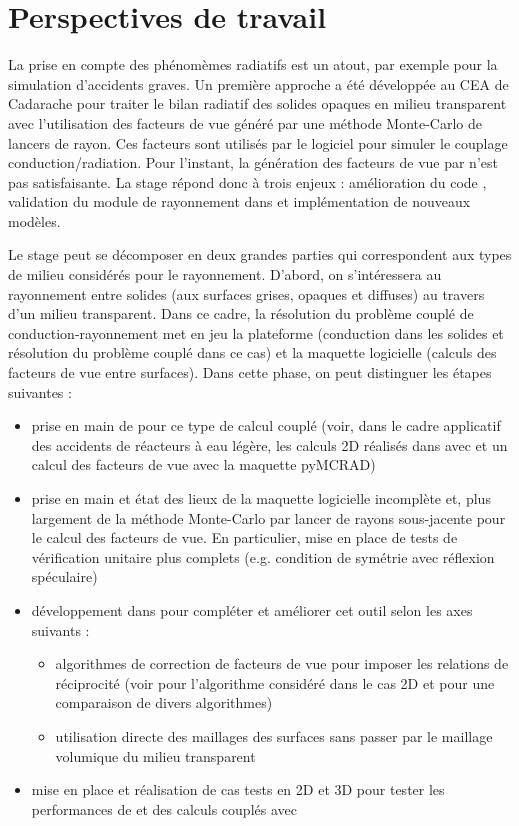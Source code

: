 \newpage
\section{Perspectives de travail}


La prise en compte des phénomèmes radiatifs est un atout, par exemple pour la simulation d'accidents graves. Un première approche a été développée au CEA de Cadarache pour traiter le bilan radiatif des solides opaques en milieu transparent avec l'utilisation des facteurs de vue généré par une méthode Monte-Carlo de lancers de rayon. Ces facteurs sont utilisés par le logiciel  pour simuler le couplage conduction/radiation. Pour l'instant, la génération des facteurs de vue par  n'est pas satisfaisante. La stage répond donc à trois enjeux : amélioration du code , validation du module de rayonnement dans   et implémentation de nouveaux modèles.

Le stage peut se décomposer en deux grandes parties qui correspondent aux types de milieu considérés pour le rayonnement. D’abord, on s’intéressera au rayonnement entre solides (aux surfaces grises, opaques et diffuses) au travers d’un milieu transparent. Dans ce cadre, la résolution du problème couplé de conduction-rayonnement met en jeu la plateforme  (conduction dans les solides et résolution du problème couplé dans ce cas) et la maquette logicielle  (calculs des facteurs de vue entre surfaces). Dans cette phase, on peut distinguer les étapes suivantes :
\begin{itemize}
    \item prise en main de  pour ce type de calcul couplé (voir, dans le cadre applicatif des accidents de réacteurs à eau légère, les calculs 2D réalisés dans \cite{Romain25,Romain26} avec  et un calcul des facteurs de vue avec la maquette pyMCRAD)
    \item prise en main et état des lieux de la maquette logicielle incomplète  et, plus largement de la méthode Monte-Carlo par lancer de rayons sous-jacente pour le calcul des facteurs de vue. En particulier, mise en place de tests de vérification unitaire plus complets (e.g. condition de symétrie avec réflexion spéculaire)
    \item développement dans  pour compléter et améliorer cet outil selon les axes suivants :
    \begin{itemize}
        \item algorithmes de correction de facteurs de vue pour imposer les relations de réciprocité (voir \cite{Romain25} pour l’algorithme considéré dans le cas 2D et \cite{renforcement} pour une comparaison de divers algorithmes)
        \item utilisation directe des maillages des surfaces sans passer par le maillage volumique du milieu transparent
    \end{itemize}
    \item mise en place et réalisation de cas tests en 2D et 3D pour tester les performances de  et des calculs couplés avec 
    
\end{itemize}

